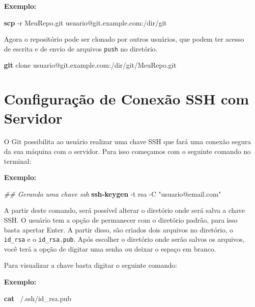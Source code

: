 \documentclass[
  a5paper,
  pagesize,
  9pt,
  pointlessnumbers,
  normalheadings,
  twoside=false
]{book}
\newenvironment{Shaded}{\begin{snugshade}}{\end{snugshade}}
\newcommand{\KeywordTok}[1]{\textcolor[rgb]{0.13,0.29,0.53}{\textbf{{#1}}}}
\newcommand{\StringTok}[1]{\textcolor[rgb]{0.31,0.60,0.02}{{#1}}}
\newcommand{\CommentTok}[1]{\textcolor[rgb]{0.56,0.35,0.01}{\textit{{#1}}}}
\newcommand{\NormalTok}[1]{{#1}}
\begin{document}
\textbf{Exemplo:}

\begin{Shaded}
\begin{Highlighting}[]
\KeywordTok{scp} \NormalTok{-r MeuRepo.git usuario@git.example.com:/dir/git}
\end{Highlighting}
\end{Shaded}

Agora o repositório pode ser clonado por outros usuários, que podem ter
acesso de escrita e de envio de arquivos \texttt{push} no diretório.

\begin{Shaded}
\begin{Highlighting}[]
\KeywordTok{git} \NormalTok{clone usuario@git.example.com:/dir/git/MeuRepo.git}
\end{Highlighting}
\end{Shaded}

\section{Configuração de Conexão SSH com
Servidor}\label{configuracao-de-conexao-ssh-com-servidor}

O Git possibilita ao usuário realizar uma chave SSH que fará uma conexão
segura da sua máquina com o servidor. Para isso começamos com o seguinte
comando no terminal:

\textbf{Exemplo:}

\begin{Shaded}
\begin{Highlighting}[]
\CommentTok{## Gerando uma chave ssh}
\KeywordTok{ssh-keygen} \NormalTok{-t rsa -C }\StringTok{"usuario@email.com"}
\end{Highlighting}
\end{Shaded}

A partir deste comando, será possível alterar o diretório onde será
salva a chave SSH. O usuário tem a opção de permanecer com o diretório
padrão, para isso basta apertar Enter. A partir disso, são criados dois
arquivos no diretório, o \texttt{id\_rsa} e o \texttt{id\_rsa.pub}. Após
escolher o diretório onde serão salvos os arquivos, você terá a opção de
digitar uma senha ou deixar o espaço em branco.

Para visualizar a chave basta digitar o seguinte comando:

\textbf{Exemplo:}

\begin{Shaded}
\begin{Highlighting}[]
\KeywordTok{cat} \NormalTok{~/.ssh/id_rsa.pub}
\end{Highlighting}
\end{Shaded}
\end{document}

